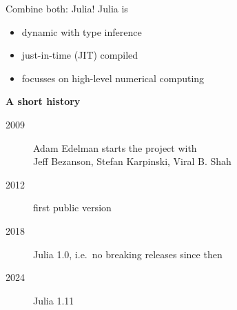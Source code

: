 \documentclass[aspectratio=169, 12pt]{beamer}
\begin{document}
    \begin{frame}{Combine both: Julia!}
        \alert{Julia} is
        \begin{itemize}
            \item dynamic with type inference
            \item just-in-time (JIT) compiled
            \item focusses on high-level numerical computing
        \end{itemize}
        \pause
        \vspace{\baselineskip}
        \textbf{\alert{A short history}}
        \begin{description}
            \item[2009] Adam Edelman starts the project with\\
            Jeff Bezanson, Stefan Karpinski, Viral B. Shah
            \item[2012] first public version
            \item[2018] Julia 1.0, i.e.\, no breaking releases since then
            \item[2024] Julia 1.11
        \end{description}
    \end{frame}
\end{document}

